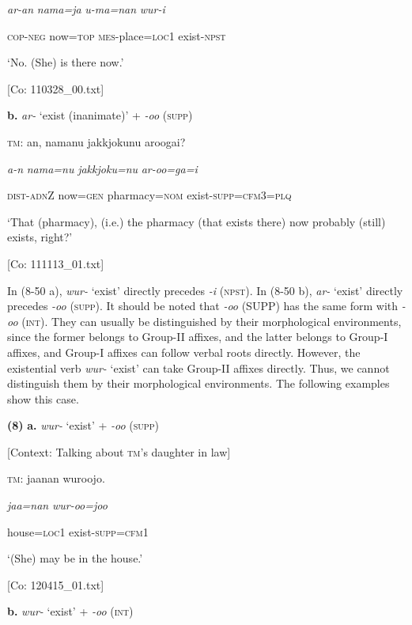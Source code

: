       \textit{ar-an}  \textit{nama=ja}  \textit{u-ma=nan}  \textit{wur-i}

      \textsc{cop}-\textsc{neg}  now=\textsc{top}  \textsc{mes}-place=\textsc{loc}1  exist-\textsc{npst}

      ‘No. (She) is there now.’

      [Co: 110328\_00.txt]

  \textbf{b.}  \textit{ar-} ‘exist (inanimate)’ + \textit{-oo} (\textsc{supp})

    \textsc{tm}:  an,  namanu  {\textbar}jakkjoku{\textbar}nu  aroogai?

      \textit{a-n}  \textit{nama=nu}  \textit{jakkjoku=nu}  \textit{ar-oo=ga=i}

      \textsc{dist}-\textsc{adn}Z  now=\textsc{gen}  pharmacy=\textsc{nom}  exist-\textsc{supp}=\textsc{cfm}3=\textsc{plq}

      ‘That (pharmacy), (i.e.) the pharmacy (that exists there) now probably (still) exists, right?’

      [Co: 111113\_01.txt]

In (8-50 a), \textit{wur-} ‘exist’ directly precedes \textit{{}-i} (\textsc{npst}). In (8-50 b), \textit{ar-} ‘exist’ directly precedes \textit{{}-oo} (\textsc{supp}). It should be noted that \textit{{}-oo} (SUPP) has the same form with \textit{{}-oo} (\textsc{int}). They can usually be distinguished by their morphological environments, since the former belongs to Group-II affixes, and the latter belongs to Group-I affixes, and Group-I affixes can follow verbal roots directly. However, the existential verb \textit{wur-} ‘exist’ can take Group-II affixes directly. Thus, we cannot distinguish them by their morphological environments. The following examples show this case.

\textbf{(8)}  \textbf{a.}  \textit{wur-} ‘exist’ + \textit{{}-oo} (\textsc{supp})

    [Context: Talking about \textsc{tm}’s daughter in law]

    \textsc{tm}:  jaanan  wuroojo.

      \textit{jaa=nan}  \textit{wur-oo=joo}

      house=\textsc{loc}1  exist-\textsc{supp}=\textsc{cfm}1

      ‘(She) may be in the house.’

      [Co: 120415\_01.txt]

  \textbf{b.}  \textit{wur-} ‘exist’ + \textit{{}-oo} (\textsc{int})

